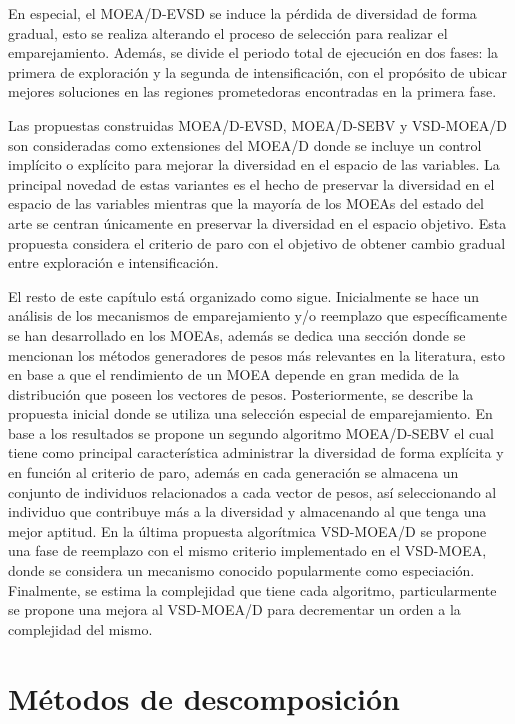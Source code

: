 En especial, el MOEA/D-EVSD se induce la pérdida de diversidad de forma gradual, esto se realiza alterando el proceso de selección para realizar el emparejamiento.
%
Además, se divide el periodo total de ejecución en dos fases: la primera de exploración y la segunda de intensificación, con el propósito de ubicar mejores soluciones en las regiones prometedoras encontradas en la primera fase.
%


Las propuestas construidas MOEA/D-EVSD, MOEA/D-SEBV y VSD-MOEA/D son consideradas como extensiones del MOEA/D donde se incluye un control implícito o explícito para mejorar la diversidad en el espacio de las variables.
%
La principal novedad de estas variantes es el hecho de preservar la diversidad en el espacio de las variables mientras que la mayoría de los MOEAs del estado del arte se centran únicamente en preservar la diversidad en el espacio objetivo.
%
Esta propuesta considera el criterio de paro con el objetivo de obtener cambio gradual entre exploración e intensificación.
%

El resto de este capítulo está organizado como sigue.
%
Inicialmente se hace un análisis de los mecanismos de emparejamiento y/o reemplazo que específicamente se han desarrollado en los MOEAs, además se dedica una sección donde se mencionan los métodos generadores de pesos más relevantes en la literatura, esto en base a que el rendimiento de un MOEA depende en gran medida de la distribución que poseen los vectores de pesos.
%
Posteriormente, se describe la propuesta inicial donde se utiliza una selección especial de emparejamiento.
%
En base a los resultados se propone un segundo algoritmo MOEA/D-SEBV el cual tiene como principal característica administrar la diversidad de forma explícita y en función al criterio de paro, además en cada generación se almacena un conjunto de individuos relacionados a cada vector de pesos, así seleccionando al individuo que contribuye más a la diversidad y almacenando al que tenga una mejor aptitud.
%
En la última propuesta algorítmica VSD-MOEA/D se propone una fase de reemplazo con el mismo criterio implementado en el VSD-MOEA, donde se considera un mecanismo conocido popularmente como especiación.
%
Finalmente, se estima la complejidad que tiene cada algoritmo, particularmente se propone una mejora al VSD-MOEA/D para decrementar un orden a la complejidad del mismo.
%

\section{Métodos de descomposición}

